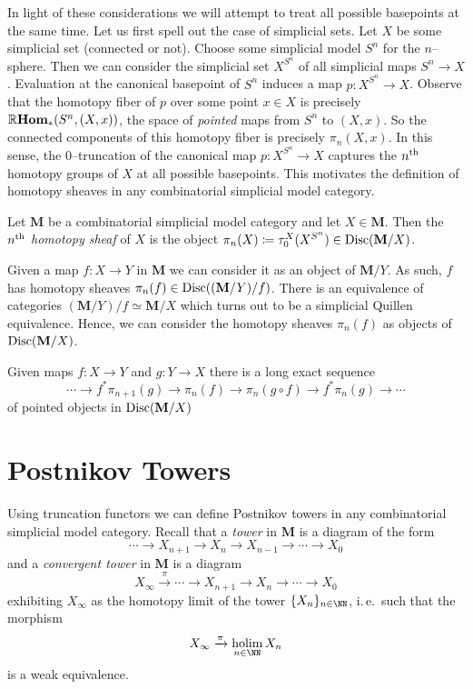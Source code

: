 In light of these considerations we will attempt to treat all possible basepoints at the same time. Let us first spell out the case of simplicial sets. Let \(X\) be some simplicial set (connected or not). Choose some simplicial model \(S^{n}\) for the \(n\)--sphere. Then we can consider the simplicial set \(X^{S^{n}}\) of all simplicial maps \(S^{n}\to X\). Evaluation at the canonical basepoint of \(S^{n}\) induces a map \(p\colon X^{S^{n}}\to X\). Observe that the homotopy fiber of \(p\) over some point \(x\in X\) is precisely \(\operatorname{\mathbb{R}\textnormal{\bfseries Hom}}_{*}(S^{n}, (X,x))\), the space of \emph{pointed} maps from \(S^{n}\) to \((X,x)\). So the connected components of this homotopy fiber is precisely \(\pi_{n}(X,x)\). In this sense, the \(0\)--truncation of the canonical map \(p\colon X^{S^{n}}\to X\) captures the \(n\textsuperscript{th}\) homotopy groups of \(X\) at all possible basepoints. This motivates the definition of homotopy sheaves in any combinatorial simplicial model category.

\begin{definition}
  Let \(\mathbf M\) be a combinatorial simplicial model category and let \(X\in\mathbf M\). Then the \emph{\(n\textsuperscript{th}\) homotopy sheaf} of \(X\) is the object \(\pi_{n}(X)\coloneqq\tau_{0}^{X}(X^{S^{n}})\in\operatorname{\textnormal{Disc}}(\mathbf M/X)\).
\end{definition}

Given a map \(f\colon X\to Y\) in \(\mathbf M\) we can consider it as an object of \(\mathbf M/Y\). As such, \(f\) has homotopy sheaves \(\pi_{n}(f)\in\operatorname{\textnormal{Disc}}((\mathbf M/Y)/f)\). There is an equivalence of categories \((\mathbf M/Y)/f\simeq \mathbf M/X\) which turns out to be a simplicial Quillen equivalence. Hence, we can consider the homotopy sheaves \(\pi_{n}(f)\) as objects of \(\operatorname{\textnormal{Disc}}(\mathbf M/X)\).

\begin{proposition}
  Given maps \(f\colon X\to Y\) and \(g\colon Y\to X\) there is a long exact sequence
  \[
  \cdots \to f^{*}\pi_{n+1}(g) \to \pi_{n}(f) \to \pi_{n}(g\circ f) \to f^{*}\pi_{n}(g) \to \cdots
  \]
  of pointed objects in \(\operatorname{\textnormal{Disc}}(\mathbf M/X)\)
\end{proposition}

\section{Postnikov Towers}

Using truncation functors we can define Postnikov towers in any combinatorial simplicial model category. Recall that a \emph{tower} in \(\mathbf M\) is a diagram of the form
\[\cdots \to X_{n+1}\to X_{n}\to X_{n-1}\to \cdots \to X_{0} \]
and a \emph{convergent tower} in \(\mathbf M\) is a diagram
\[X_{\infty}\xrightarrow{\pi} \cdots \to X_{n+1}\to X_{n}\to\cdots\to X_{0}\]
exhibiting \(X_{\infty}\) as the homotopy limit of the tower \(\{X_{n}\}_{n\in\NN}\), i.\,e.~such that the morphism
\[X_{\infty}\xrightarrow{\pi}\holim_{n\in\NN} X_{n}\]
is a weak equivalence.

